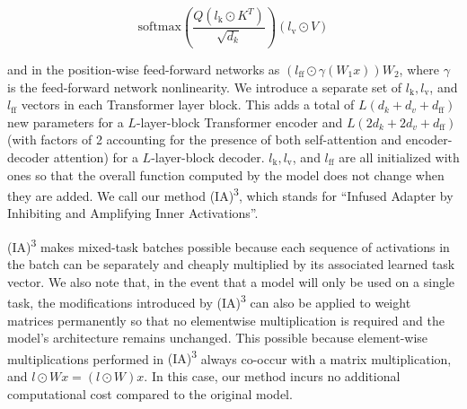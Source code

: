\begin{equation*}
    \mathrm{softmax}\mathopen{}\left(\frac{Q(l_\mathrm{k} \odot K^T)}{\sqrt{d_k}}\right)(l_\mathrm{v} \odot V) 
\end{equation*}

and in the position-wise feed-forward networks as $(l_\mathrm{ff} \odot \gamma(W_1x))W_2$, where $\gamma$ is the feed-forward network nonlinearity. We introduce a separate set of $l_{\mathrm{k}}, l_{\mathrm{v}}$, and $l_{\mathrm{ff}}$ vectors in each Transformer layer block. This adds a total of $L (d_k + d_v + d_\mathrm{ff})$ new parameters for a $L$-layer-block Transformer encoder and $L (2d_k + 2d_v + d_\mathrm{ff})$ (with factors of 2 accounting for the presence of both self-attention and encoder-decoder attention) for a $L$-layer-block decoder.
$l_{\mathrm{k}}, l_{\mathrm{v}}$, and $l_{\mathrm{ff}}$ are all initialized with ones so that the overall function computed by the model does not change when they are added. We call our method {\selectfont (IA)\textsuperscript{3}}, which stands for ``Infused Adapter by Inhibiting and Amplifying Inner Activations''.

{\selectfont (IA)\textsuperscript{3}} makes mixed-task batches possible because each sequence of activations in the batch can be separately and cheaply multiplied by its associated learned task vector. We also note that, in the event that a model will only be used on a single task, the modifications introduced by {\selectfont (IA)\textsuperscript{3}} can also be applied to weight matrices permanently so that no elementwise multiplication is required and the model's architecture remains unchanged. This possible because element-wise multiplications performed in {\selectfont (IA)\textsuperscript{3}} always co-occur with a matrix multiplication, and $l \odot Wx = (l \odot W)x$. In this case, our method incurs no additional computational cost compared to the original model.

